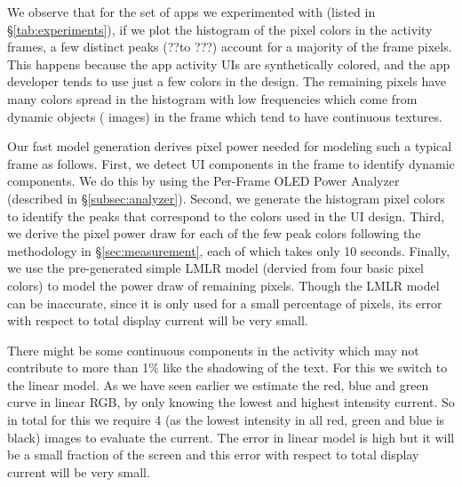 We observe that for the set of apps we experimented with (listed in
\S\ref{tab:experiments}), if we plot the histogram of the pixel colors
in the activity frames, a few distinct peaks (??to ???) account for a majority of
the frame pixels. This happens because the app activity UIs are
synthetically colored, and the app developer tends to use just a few colors
in the design. The remaining pixels have many colors spread in the
histogram with low frequencies which come from dynamic objects (\eg
images) in the frame which tend to have continuous textures.




Our fast model generation derives pixel power needed for modeling such
a typical frame as follows. First, we detect UI components in the frame to
identify dynamic components. We do this by using the Per-Frame OLED Power 
Analyzer (described in \S\ref{subsec:analyzer}).  Second, we generate the histogram
pixel colors to identify the peaks that correspond to the colors used
in the UI design. Third, we derive the pixel power draw for each of the few peak colors
following the methodology in \S\ref{sec:measurement},
each of which takes only 10 seconds. Finally,
we use the pre-generated simple LMLR model (dervied from four basic pixel colors)
to model the power draw of remaining pixels.
Though the LMLR model can be inaccurate, since it is only used for a small percentage of pixels,
its error with respect to total display current will be very small.

\fi



There might be some continuous components in the activity which may not contribute
to more than 1\% like the shadowing of the text. For this we switch to the linear model.
As we have seen earlier we estimate the red, blue and green curve in linear RGB,
by only knowing the lowest and highest intensity current. So in total for this we
require 4 (as the lowest intensity in all red, green and blue is black) images to evaluate the current.
The error in linear model is high but it will be a small fraction of the screen and
this error with respect to total display current will be very small.

